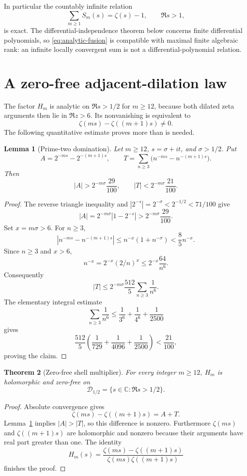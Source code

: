 \documentclass[11pt]{article}
\newtheorem{theorem}{Theorem}[section]
\newtheorem{lemma}[theorem]{Lemma}
\theoremstyle{definition}
\theoremstyle{remark}
\newcommand{\C}{\mathbb C}
\newcommand{\cD}{\mathcal D}
\begin{document}
In particular the countably infinite relation
\[
 \sum_{m\geq1}S_m(s)=\zeta(s)-1,\qquad \Re s>1,
 \label{eq:analytic-fusion}
 \tag{2.6}
\]
is exact.  The differential-independence theorem below concerns finite differential
polynomials, so \eqref{eq:analytic-fusion} is compatible with maximal finite algebraic rank:
an infinite locally convergent sum is not a differential-polynomial relation.

\section{A zero-free adjacent-dilation law}\label{sec:zerofree}

The factor \(H_m\) is analytic on \(\Re s>1/2\) for \(m\geq12\), because both dilated zeta
arguments then lie in \(\Re z>6\).  Its nonvanishing is equivalent to
\[
 \zeta(ms)-\zeta((m+1)s)\ne0.
\]
The following quantitative estimate proves more than is needed.

\begin{lemma}[Prime-two domination]\label{lem:two-dominates}
Let \(m\geq12\), \(s=\sigma+it\), and \(\sigma>1/2\).  Put
\[
 A=2^{-ms}-2^{-(m+1)s},
\qquad
 T=\sum_{n\geq3}\bigl(n^{-ms}-n^{-(m+1)s}\bigr).
\]
Then
\[
 |A|>2^{-m\sigma}\frac{29}{100},
 \qquad
 |T|<2^{-m\sigma}\frac{21}{100}.
 \tag{3.1}
\]
\end{lemma}

\begin{proof}
The reverse triangle inequality and \(|2^{-s}|=2^{-\sigma}<2^{-1/2}<71/100\) give
\[
 |A|=2^{-m\sigma}|1-2^{-s}|
 >2^{-m\sigma}\frac{29}{100}.
\]
Set \(x=m\sigma>6\).  For \(n\geq3\),
\[
 |n^{-ms}-n^{-(m+1)s}|
 \leq n^{-x}(1+n^{-\sigma})
 <\frac85 n^{-x}.
\]
Since \(n\geq3\) and \(x>6\),
\[
 n^{-x}=2^{-x}(2/n)^x
 \leq2^{-x}\frac{64}{n^6}.
\]
Consequently
\[
 |T|
 \leq2^{-m\sigma}\frac{512}{5}\sum_{n\geq3}\frac1{n^6}.
\]
The elementary integral estimate
\[
 \sum_{n\geq3}\frac1{n^6}
 \leq\frac1{3^6}+\frac1{4^6}+\frac1{2500}
\]
gives
\[
 \frac{512}{5}
 \left(\frac1{729}+\frac1{4096}+\frac1{2500}\right)
 <\frac{21}{100},
\]
proving the claim.
\end{proof}

\begin{theorem}[Zero-free shell multiplier]\label{thm:zero-free}
For every integer \(m\geq12\), \(H_m\) is holomorphic and zero-free on
\[
 \cD_{1/2}=\{s\in\C:\Re s>1/2\}.
\]
\end{theorem}

\begin{proof}
Absolute convergence gives
\[
 \zeta(ms)-\zeta((m+1)s)=A+T.
\]
Lemma~\ref{lem:two-dominates} implies \(|A|>|T|\), so this difference is nonzero.
Furthermore \(\zeta(ms)\) and \(\zeta((m+1)s)\) are holomorphic and nonzero because their
arguments have real part greater than one.  The identity
\[
 H_m(s)=
 \frac{\zeta(ms)-\zeta((m+1)s)}
 {\zeta(ms)\zeta((m+1)s)}
\]
finishes the proof.
\end{proof}
\end{document}
